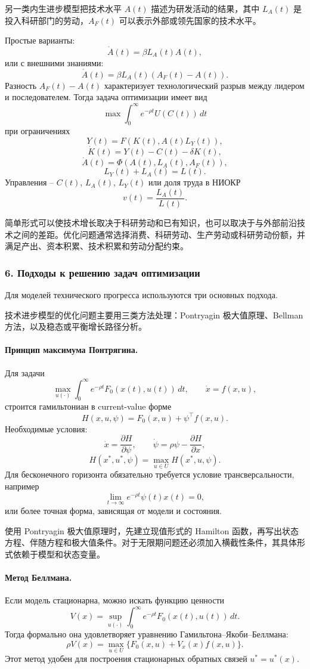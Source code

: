 \documentclass[12pt,a4paper]{article}
\newcommand{\zh}[1]{\par\noindent #1\par}
\begin{document}
\zh{另一类内生进步模型把技术水平 $A(t)$ 描述为研发活动的结果，其中 $L_A(t)$ 是投入科研部门的劳动，$A_F(t)$ 可以表示外部或领先国家的技术水平。}

Простые варианты:
\[
\dot A(t)=\beta L_A(t)A(t),
\]
или с внешними знаниями:
\[
\dot A(t)=\beta L_A(t)(A_F(t)-A(t)).
\]
Разность $A_F(t)-A(t)$ характеризует технологический разрыв между лидером и последователем. Тогда задача оптимизации имеет вид
\[
\max \int_0^\infty e^{-\rho t}U(C(t))\,dt
\]
при ограничениях
\[
Y(t)=F(K(t),A(t)L_Y(t)),
\]
\[
\dot K(t)=Y(t)-C(t)-\delta K(t),
\]
\[
\dot A(t)=\Phi(A(t),L_A(t),A_F(t)),
\]
\[
L_Y(t)+L_A(t)=L(t).
\]
Управления -- $C(t)$, $L_A(t)$, $L_Y(t)$ или доля труда в НИОКР
\[
v(t)=\frac{L_A(t)}{L(t)}.
\]

\zh{简单形式可以使技术增长取决于科研劳动和已有知识，也可以取决于与外部前沿技术之间的差距。优化问题通常选择消费、科研劳动、生产劳动或科研劳动份额，并满足产出、资本积累、技术积累和劳动分配约束。}


\subsubsection*{6. Подходы к решению задач оптимизации}
Для моделей технического прогресса используются три основных подхода.

\zh{技术进步模型的优化问题主要用三类方法处理：Pontryagin 极大值原理、Bellman 方法，以及稳态或平衡增长路径分析。}

\paragraph{Принцип максимума Понтрягина.}
Для задачи
\[
\max_{u(\cdot)}\int_0^\infty e^{-\rho t}F_0(x(t),u(t))\,dt,
\qquad \dot x=f(x,u),
\]
строится гамильтониан в current-value форме
\[
H(x,u,\psi)=F_0(x,u)+\psi^\top f(x,u).
\]
Необходимые условия:
\[
\dot x=\frac{\partial H}{\partial \psi},\qquad
\dot\psi=\rho\psi-\frac{\partial H}{\partial x},
\]
\[
H(x^*,u^*,\psi)=\max_{u\in U}H(x^*,u,\psi).
\]
Для бесконечного горизонта обязательно требуется условие трансверсальности, например
\[
\lim_{t\to\infty}e^{-\rho t}\psi(t)x(t)=0,
\]
или более точная форма, зависящая от модели и состояния.

\zh{使用 Pontryagin 极大值原理时，先建立现值形式的 Hamilton 函数，再写出状态方程、伴随方程和极大值条件。对于无限期问题还必须加入横截性条件，其具体形式依赖于模型和状态变量。}

\paragraph{Метод Беллмана.}
Если модель стационарна, можно искать функцию ценности
\[
V(x)=\sup_{u(\cdot)}\int_0^\infty e^{-\rho t}F_0(x(t),u(t))\,dt.
\]
Тогда формально она удовлетворяет уравнению Гамильтона--Якоби--Беллмана:
\[
\rho V(x)=\max_{u\in U}\{F_0(x,u)+V_x(x)f(x,u)\}.
\]
Этот метод удобен для построения стационарных обратных связей $u^*=u^*(x)$.
\end{document}
